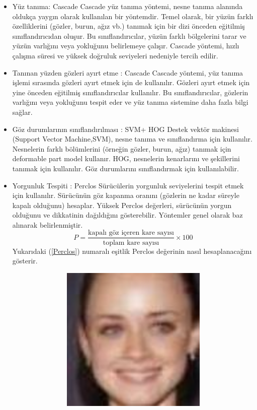 \documentclass[12pt, a4paper]{article}
\begin{document}
	\begin{itemize}
		
	\item Yüz tanıma: Cascade \newline
	Cascade yüz tanıma yöntemi, nesne tanıma alanında oldukça yaygın olarak kullanılan bir yöntemdir.
	Temel olarak, bir yüzün farklı özelliklerini (gözler, burun, ağız vb.) tanımak için bir dizi önceden eğitilmiş sınıflandırıcıdan oluşur.
	Bu sınıflandırıcılar, yüzün farklı bölgelerini tarar ve yüzün varlığını veya yokluğunu belirlemeye çalışır.
	Cascade yöntemi, hızlı çalışma süresi ve yüksek doğruluk seviyeleri nedeniyle tercih edilir.
	\item Tanınan yüzden gözleri ayırt etme : Cascade  \newline
	Cascade yöntemi, yüz tanıma işlemi sırasında gözleri ayırt etmek için de kullanılır.
	Gözleri ayırt etmek için yine önceden eğitilmiş sınıflandırıcılar kullanılır.
	Bu sınıflandırıcılar, gözlerin varlığını veya yokluğunu tespit eder ve yüz tanıma sistemine daha fazla bilgi sağlar.
	\item Göz durumlarının sınıflandırılması : SVM+ HOG  \newline
	Destek vektör makinesi (Support Vector Machine,SVM), nesne tanıma ve sınıflandırma için kullanılır. Nesnelerin farklı bölümlerini (örneğin gözler, burun, ağız) tanımak için deformable part model kullanır.
	HOG, nesnelerin kenarlarını ve şekillerini tanımak için kullanılır. Göz durumlarını sınıflandırmak için kullanılabilir.
	\item Yorgunluk Tespiti : Perclos
	Sürücülerin yorgunluk seviyelerini tespit etmek için kullanılır.
	Sürücünün göz kapanma oranını (gözlerin ne kadar süreyle kapalı olduğunu) hesaplar.
	Yüksek Perclos değerleri, sürücünün yorgun olduğunu ve dikkatinin dağıldığını gösterebilir. Yöntemler genel olarak \cite{ieeedata} baz alınarak belirlenmiştir.
	\begin{equation}\label{Perclos}
		P = \frac{\text{kapalı göz içeren kare sayısı}}{\text{toplam kare sayısı}} \times 100
	\end{equation}
	Yukarıdaki (\ref{Perclos}) numaralı eşitlik Perclos değerinin nasıl hesaplanacağını gösterir.
	\begin{figure}[!h]
		\centering
		\includegraphics[width=14cm, height=7cm, keepaspectratio]{Alexis_Bledel_0001.jpg}

\end{figure}
\end{itemize}
\end{document}

